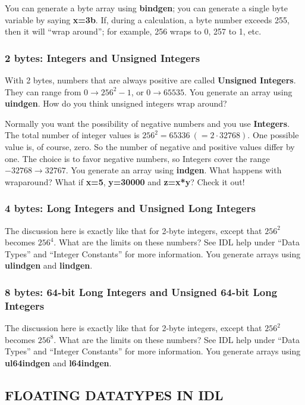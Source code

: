 \documentclass[psfig,preprint]{aastex}
\begin{document}
You can generate a byte array using {\bf bindgen};
you can generate a single byte variable by saying {\bf
x=3b}.  If, during a calculation, a byte number exceeds 255, then it
will ``wrap around''; for example, 256 wraps to 0, 257 to 1, etc. 

\subsubsection{2 bytes: Integers and Unsigned Integers} 

	With 2 bytes, numbers that are always positive are called {\bf
Unsigned Integers}.  They can range from $0 \rightarrow 256^2 -1$, or $0
\rightarrow 65535$.  You generate an array using {\bf uindgen}.  How do
you think unsigned integers wrap around?

	Normally you want the possibility of negative numbers and you
use {\bf Integers}.  The total number of integer values is $256^2 =
65336 \ (=2 \cdot 32768)$.  One possible value is, of course, zero.  So the number of
negative and positive values differ by one.  The choice is to favor
negative numbers, so Integers cover the range $-32768 \rightarrow
32767$.  You generate an array using {\bf indgen}.  What happens with
wraparound? What if {\bf x=5}, {\bf y=30000} and {\bf z=x*y}? Check it
out!

\subsubsection{4 bytes: Long Integers and Unsigned Long Integers} 

	The discussion here is exactly like that for 2-byte integers,
except that $256^2$ becomes $256^4$.  What are the limits on these
numbers? See IDL help under ``Data Types'' and ``Integer Constants'' for
more information.  You generate arrays using {\bf ulindgen} and {\bf
lindgen}. 

\subsubsection{8 bytes: 64-bit Long Integers and Unsigned 64-bit Long
Integers}

	The discussion here is exactly like that for 2-byte integers,
except that $256^2$ becomes $256^8$.  What are the limits on these
numbers? See IDL help under ``Data Types'' and ``Integer Constants'' for
more information.  You generate arrays using {\bf ul64indgen} and {\bf
l64indgen}. 

\subsection {FLOATING DATATYPES IN IDL} \label{floats}
\end{document}
